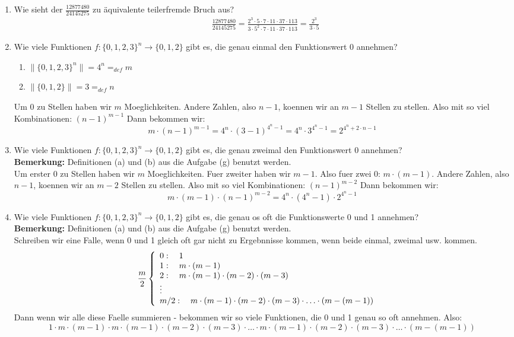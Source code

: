 \begin{enumerate}[label=(\alph*)]
		\item Wie sieht der $\frac{12877480}{24145275}$ zu äquivalente teilerfremde Bruch aus?
		\begin{align*}
			& \frac{12877480}{24145275} = \frac{2^3 \cdot 5 \cdot 7 \cdot 11 \cdot 37 \cdot 113}
			{3 \cdot 5^2 \cdot 7 \cdot 11 \cdot 37 \cdot 113} = \frac{2^3}{3 \cdot 5}
		\end{align*}

		\item Wie viele Funktionen $f : \{0, 1, 2, 3\}^n \to \{0, 1, 2\}$ gibt es, die genau einmal den Funktionswert 0 annehmen?
		\begin{enumerate}
			\item $\|\{0,1,2,3\}^n\| = 4^n =_{def}m$
			\item $\|\{0,1,2\}\| = 3 =_{def}n$
		\end{enumerate}
		Um 0 zu Stellen haben wir $m$ Moeglichkeiten. Andere Zahlen, also $n-1$, koennen wir
		an $m-1$ Stellen zu stellen. Also mit so viel Kombinationen: $(n-1)^{m-1}$
		Dann bekommen wir: 
		\[m\cdot(n-1)^{m-1} = 4^n\cdot(3-1)^{4^n-1} = 4^n\cdot3^{4^n-1} = 2^{4^n+2\cdot n-1}\]

		\item Wie viele Funktionen $f : \{0, 1, 2, 3\}^n \to \{0, 1, 2\}$ gibt es, die genau zweimal den Funktionswert 0 annehmen? \\
		\textbf{Bemerkung:} Definitionen (a) und (b) aus die Aufgabe (g) benutzt werden. \\
		Um erster 0 zu Stellen haben wir $m$ Moeglichkeiten. Fuer zweiter haben wir $m-1$.
		Also fuer zwei 0: $m\cdot (m-1)$. Andere Zahlen, also $n-1$, koennen wir
		an $m-2$ Stellen zu stellen. Also mit so viel Kombinationen: $(n-1)^{m-2}$
		Dann bekommen wir:
		\[m\cdot(m-1)\cdot(n-1)^{m-2} = 4^n\cdot(4^n-1)\cdot2^{4^n-1}\] 

		\item Wie viele Funktionen $f : \{0, 1, 2, 3\}^n \to \{0, 1, 2\}$ gibt es, die genau os oft die Funktionswerte 0 und 1 annehmen? \\
		\textbf{Bemerkung:} Definitionen (a) und (b) aus die Aufgabe (g) benutzt werden. \\
		Schreiben wir eine Falle, wenn 0 und 1 gleich oft gar nicht zu Ergebnnisse kommen, wenn beide einmal, zweimal usw. kommen.
		\[ \frac{m}{2} \left\{ 
			\begin{array}{l l}
		   		0: \quad 1  & \\
		    	1: \quad m\cdot(m-1) & \\
		    	2: \quad m\cdot(m-1)\cdot(m-2)\cdot(m-3) & \\
		    		\vdots \\
		    	m/2: \quad m\cdot(m-1)\cdot(m-2)\cdot(m-3)\cdot \ldots \cdot(m-(m-1))& 
		  	\end{array} 
		\right.\]
		Dann wenn wir alle diese Faelle summieren - bekommen wir so viele Funktionen, die 0 und 1 genau so oft annehmen. Also:
		\[1 \cdot m\cdot(m-1) \cdot m\cdot(m-1)\cdot(m-2)\cdot(m-3)\cdot \ldots \cdot m\cdot(m-1)\cdot(m-2)\cdot(m-3)\cdot \ldots \cdot(m-(m-1))\]


\end{enumerate}
